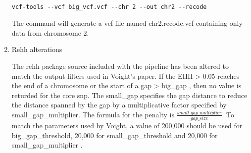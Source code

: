 \documentclass[a4paper,10pt]{article}
\begin{document}
\begin{enumerate}
\begin{verbatim}

vcf-tools --vcf big_vcf.vcf --chr 2 --out chr2 --recode

\end{verbatim}

The command will generate a vcf file named chr2.recode.vcf containing only data from chromosome 2.

\item Rehh alterations

The rehh package source included with the pipeline has been altered to match the output filters used in Voight's paper. If the EHH > 0.05
reaches the end of a chromosome or the start of a gap >
big\_gap , then no value is returded for the core snp. The
small\_gap specifies the gap distance to reduce the
distance spanned by the gap by a multiplicative factor specified by
small\_gap\_multiplier. The formula for the penalty is
$\frac{small\_gap\_multiplier}{gap\_size}$. To match the parameters
used by Voight, a value of 200,000 should be  used for big\_gap\_threshold, 20,000
for small\_gap\_threshold and 20,000 for small\_gap\_multiplier
\citep{Voight:2006go}.

\end{enumerate}
\clearpage


\end{document}
